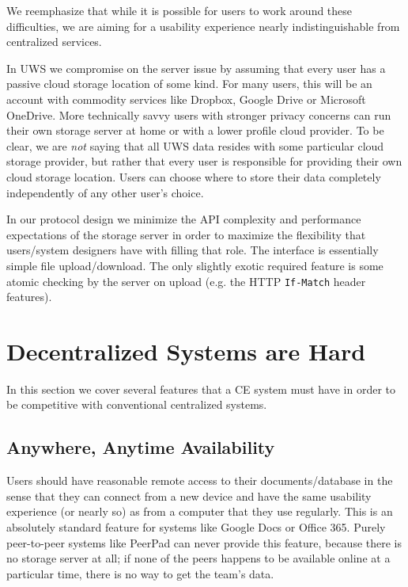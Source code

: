 \documentclass{article}
\begin{document}

We reemphasize that while it is possible for users to work around these difficulties, we are aiming for a usability experience nearly indistinguishable from centralized services.

In UWS we compromise on the server issue by assuming that every user has a passive cloud storage location of some kind.
For many users, this will be an account with commodity services like Dropbox, Google Drive or Microsoft OneDrive.
More technically savvy users with stronger privacy concerns can run their own storage server at home or with a lower profile cloud provider.
To be clear, we are \emph{not} saying that all UWS data resides with some particular cloud storage provider, but rather that every user is responsible for providing their own cloud storage location.
Users can choose where to store their data completely independently of any other user's choice.

In our protocol design we minimize the API complexity and performance expectations of the storage server in order to maximize the flexibility that users/system designers have with filling that role.
The interface is essentially simple file upload/download.
The only slightly exotic required feature is some atomic checking by the server on upload (e.g. the HTTP \texttt{If-Match} header features).

\section{Decentralized Systems are Hard}

In this section we cover several features that a CE system must have in order to be competitive with conventional centralized systems.

\subsection{Anywhere, Anytime Availability}

Users should have reasonable remote access to their documents{\slash}database in the sense that they can connect from a new device and have the same usability experience (or nearly so) as from a computer that they use regularly.
This is an absolutely standard feature for systems like Google Docs or Office 365.
Purely peer-to-peer systems like PeerPad can never provide this feature, because there is no storage server at all; if none of the peers happens to be available online at a particular time, there is no way to get the team's data.
\end{document}
